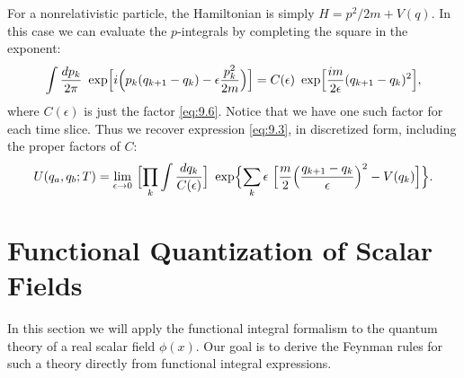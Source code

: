 For a nonrelativistic particle, the Hamiltonian is simply
$H = p^2/2m + V(q)$.  In this case we can evaluate the $p$-integrals by
completing the square in the exponent:
\begin{equation}
  \int \frac{dp_k}{2\pi}\ \exp\Bigl[ i\Bigl( p_k(q_{k+1}-q_k)
    - \epsilon\frac{p_k^2}{2m} \Bigr) \Bigr]
  = C(\epsilon)\ \exp\Bigl[ \frac{im}{2\epsilon}(q_{k+1}-q_k)^2 \Bigr] ,
\end{equation}
where $C(\epsilon)$ is just the factor \eqref{eq:9.6}.  Notice that we have one
such factor for each time slice.  Thus we recover expression \eqref{eq:9.3},
in discretized form, including the proper factors of $C$:
\begin{equation}
  U(q_a, q_b; T) = \lim_{\epsilon\to 0}\ \Bigl[ \prod_k
    \int \frac{dq_k}{C(\epsilon)} \Bigr]\
    \exp\Bigl\{ \sum_k \epsilon\ \Bigl[ \frac{m}{2}\Bigl(
      \frac{q_{k+1}-q_k}{\epsilon} \Bigr)^2 - V(q_k) \Bigr] \Bigr\}.
  \label{eq:9.13}
\end{equation}

\section{Functional Quantization of Scalar Fields}

In this section we will apply the functional integral formalism to the quantum
theory of a real scalar field $\phi(x)$.  Our goal is to derive the Feynman
rules for such a theory directly from functional integral expressions.

